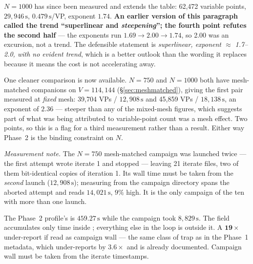 \documentclass[11pt,a4paper]{article}
\begin{document}
\(N{=}1000\) has since been measured and extends the table: 62{,}472 variable
points, \(29{,}946\,\mathrm{s}\), \(0.479\,\mathrm{s}\)/VP, exponent
\(\mathbf{1.74}\). \textbf{An earlier version of this paragraph called the trend
``superlinear and \emph{steepening}''; the fourth point refutes the second half}
--- the exponents run \(1.69 \to 2.00 \to 1.74\), so 2.00 was an excursion, not a
trend. The defensible statement is \emph{superlinear, exponent \(\approx\)
1.7--2.0, with no evident trend}, which is a better outlook than the wording it
replaces because it means the cost is not accelerating away.

One cleaner comparison is now available. \(N{=}750\) and \(N{=}1000\) both have
mesh-matched companions on \(V{=}114{,}144\) (\S\ref{sec:meshmatched}), giving the
first pair measured at \emph{fixed} mesh: 39{,}704 VPs / \(12{,}908\,\mathrm{s}\)
and 45{,}859 VPs / \(18{,}138\,\mathrm{s}\), an exponent of \(\mathbf{2.36}\) ---
steeper than any of the mixed-mesh figures, which suggests part of what was being
attributed to variable-point count was a mesh effect. Two points, so this is a
flag for a third measurement rather than a result. Either way Phase~2 is the
binding constraint on \(N\).

\emph{Measurement note.} The \(N{=}750\) mesh-matched campaign was launched twice
--- the first attempt wrote iterate 1 and stopped --- leaving 21 iterate files,
two of them bit-identical copies of iteration 1. Its wall time must be taken from
the \emph{second} launch (\(12{,}908\,\mathrm{s}\)); measuring from the campaign
directory spans the aborted attempt and reads \(14{,}021\,\mathrm{s}\), \(9\%\)
high. It is the only campaign of the ten with more than one launch.

\begin{tcolorbox}[colback=red!3!white, colframe=red!45!black,
                  title={A reporting trap in \code{timing\_profile.yaml}},
                  fontupper=\small]
The Phase~2 profile's  is \(459.27\,\mathrm{s}\)
while the campaign took \(8{,}829\,\mathrm{s}\). The field accumulates only time
inside ; everything else in the loop is outside it. A
\(\mathbf{19\times}\) under-report if read as campaign wall --- the same class of
trap as  in the Phase~1 metadata, which under-reports by
\(3.6\times\) and is already documented. Campaign wall must be taken from the
iterate timestamps.
\end{tcolorbox}
\end{document}
